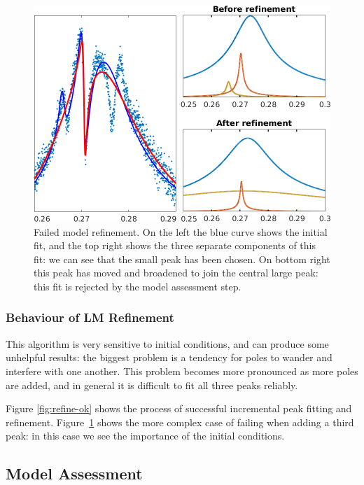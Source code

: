 \documentclass[
    a4paper,
    keeplastbox,            %
    hyphens,                %
    nospread,               %
    refpage,                %
]{jacow}
\newcommand{\squarecaption}[2][1]{\caption[#1]{#2\unskip\parfillskip 0pt}}
\begin{document}
\begin{figure}[ht]
\includegraphics[width=\linewidth]{WECO03f4.png}
\squarecaption{%
Failed model refinement.  On the left the blue curve shows the initial fit, and
the top right shows the three separate components of this fit: we can see that
the small peak has been chosen.  On bottom right this peak has moved and
broadened to join the central large peak: this fit is rejected by the model
assessment step.
}
\label{fig:refine-fail}
\end{figure}


\subsubsection{Behaviour of LM Refinement}

This algorithm is very sensitive to initial conditions, and can produce some
unhelpful results: the biggest problem is a tendency for poles to wander and
interfere with one another.  This problem becomes more pronounced as more poles
are added, and in general it is difficult to fit all three peaks reliably.

Figure \ref{fig:refine-ok} shows the process of successful incremental peak
fitting and refinement.  Figure~\ref{fig:refine-fail} shows the more complex
case of failing when adding a third peak: in this case we see the importance of
the initial conditions.


\subsection{Model Assessment}
\end{document}
